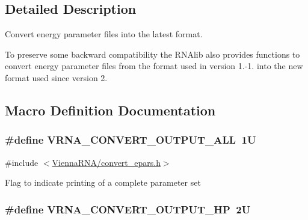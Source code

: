 \subsection{Detailed Description}
Convert energy parameter files into the latest format. 

To preserve some backward compatibility the R\+N\+Alib also provides functions to convert energy parameter files from the format used in version 1.-\/1. into the new format used since version 2. 

\subsection{Macro Definition Documentation}
\subsubsection[{\texorpdfstring{V\+R\+N\+A\+\_\+\+C\+O\+N\+V\+E\+R\+T\+\_\+\+O\+U\+T\+P\+U\+T\+\_\+\+A\+LL}{VRNA_CONVERT_OUTPUT_ALL}}]{\setlength{\rightskip}{0pt plus 5cm}\#define V\+R\+N\+A\+\_\+\+C\+O\+N\+V\+E\+R\+T\+\_\+\+O\+U\+T\+P\+U\+T\+\_\+\+A\+LL~1U}\hypertarget{group__energy__parameters__convert_ga8dc6aee5a806c49b71557152f9616bc4}{}\label{group__energy__parameters__convert_ga8dc6aee5a806c49b71557152f9616bc4}


{\ttfamily \#include $<$\hyperlink{convert__epars_8h}{Vienna\+R\+N\+A/convert\+\_\+epars.\+h}$>$}

Flag to indicate printing of a complete parameter set 
\subsubsection[{\texorpdfstring{V\+R\+N\+A\+\_\+\+C\+O\+N\+V\+E\+R\+T\+\_\+\+O\+U\+T\+P\+U\+T\+\_\+\+HP}{VRNA_CONVERT_OUTPUT_HP}}]{\setlength{\rightskip}{0pt plus 5cm}\#define V\+R\+N\+A\+\_\+\+C\+O\+N\+V\+E\+R\+T\+\_\+\+O\+U\+T\+P\+U\+T\+\_\+\+HP~2U}\hypertarget{group__energy__parameters__convert_gaf66fe2cb11dfcfd32d791049c254a8a4}{}\label{group__energy__parameters__convert_gaf66fe2cb11dfcfd32d791049c254a8a4}


